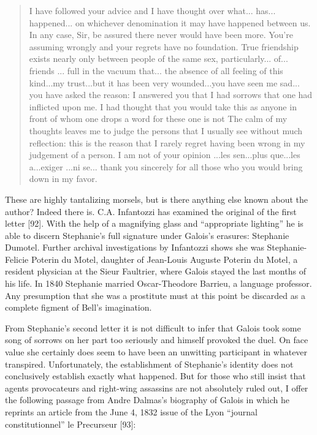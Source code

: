 \documentclass[12pt]{article}
\begin{document}
\begin{quote}
I have followed your advice and I have thought over what... has... happened... on whichever denomination it may have happened between us. In any case, Sir, be assured there never would have been more. You're assuming wrongly and your regrets have no foundation. True friendship exists nearly only between people of the same sex, particularly... of... friends ... full in the vacuum that... the absence of all feeling of this kind...my trust...but it has been very wounded...you have seen me sad... you have asked the reason: I answered you that I had sorrows that one had inflicted upon me. I had thought that you would take this as anyone in front of whom one drops a word for these one is not The calm of my thoughts leaves me to judge the persons that I usually see without much reflection: this is the reason that I rarely regret having been wrong in my judgement of a person. I am not of your opinion ...les sen...plus que...les a...exiger ...ni se... thank you sincerely for all those who you would bring down in my favor.
\end{quote}
These are highly tantalizing morsels, but is there anything else known about the author? Indeed there is. C.A. Infantozzi has examined the original of the first letter [92]. With the help of a magnifying glass and ``appropriate lighting'' he is able to discern Stephanie's full signature under Galois's erasures: Stephanie Dumotel. Further archival investigations by Infantozzi shows she was Stephanie-Felicie Poterin du Motel, daughter of Jean-Louis Auguste Poterin du Motel, a resident physician at the Sieur Faultrier, where Galois stayed the last months of his life. In 1840 Stephanie married Oscar-Theodore Barrieu, a language professor. Any presumption that she was a prostitute must at this point be discarded as a complete figment of Bell's imagination.

From Stephanie's second letter it is not difficult to infer that Galois took some song of sorrows on her part too seriously and himself provoked the duel. On face value she certainly does seem to have been an unwitting participant in whatever transpired. 
Unfortunately, the establishment of Stephanie's identity does not conclusively establish exactly what happened. But for those who still insist that agents provocateurs and right-wing assassins are not absolutely ruled out, I offer the following passage from Andre Dalmas's biography of Galois in which he reprints an article from the June 4, 1832 issue of the Lyon ``journal constitutionnel'' le Precurseur [93]:
\end{document}
